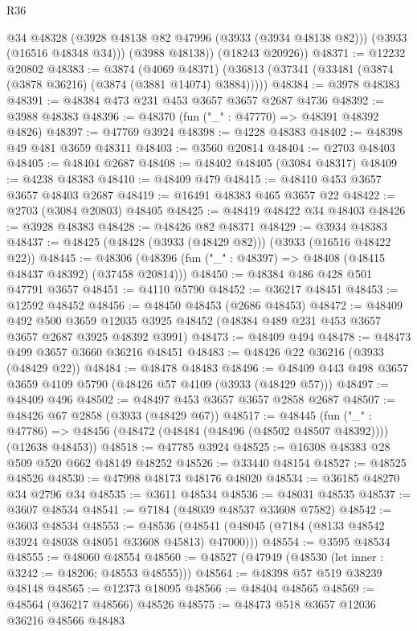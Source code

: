 \begin{lexlean}{R36}
\begin{coremodule}
          @34
          @48328
          (@3928 @48138 @82 @47996 (@3933 (@3934 @48138 @82)))
          (@3933 (@16516 @48348 @34)))
        (@3988 @48138))
      (@18243 @20926))
@48371 := @12232 @20802
@48383 := @3874
    (@4069 @48371)
    (@36813 (@37341 (@33481 (@3874 (@3878 @36216) (@3874 (@3881 @14074) @3884)))))
@48384 := @3978 @48383
@48391 := @48384 @473 @231 @453 @3657 @3657 @2687 @4736
@48392 := @3988 @48383
@48396 := @48370 (fun ("_" : @47770) => @48391 @48392 @4826)
@48397 := @47769 @3924
@48398 := @4228 @48383
@48402 := @48398 @49 @481 @3659 @48311
@48403 := @3560 @20814
@48404 := @2703 @48403
@48405 := @48404 @2687
@48408 := @48402 @48405 (@3084 @48317)
@48409 := @4238 @48383
@48410 := @48409 @479
@48415 := @48410 @453 @3657 @3657 @48403 @2687
@48419 := @16491 @48383 @465 @3657 @22
@48422 := @2703 (@3084 @20803) @48405
@48425 := @48419 @48422 @34 @48403
@48426 := @3928 @48383
@48428 := @48426 @82 @48371
@48429 := @3934 @48383
@48437 := @48425 (@48428 (@3933 (@48429 @82))) (@3933 (@16516 @48422 @22))
@48445 := @48306 (@48396 (fun ("_" : @48397) => @48408 (@48415 @48437 @48392) (@37458 @20814)))
@48450 := @48384 @486 @428 @501 @47791 @3657
@48451 := @4110 @5790
@48452 := @36217 @48451
@48453 := @12592 @48452
@48456 := @48450 @48453 (@2686 @48453)
@48472 := @48409
    @492
    @500
    @3659
    @12035
    @3925
    @48452
    (@48384 @489 @231 @453 @3657 @3657 @2687 @3925 @48392 @3991)
@48473 := @48409 @494
@48478 := @48473 @499 @3657 @3660 @36216 @48451
@48483 := @48426 @22 @36216 (@3933 (@48429 @22))
@48484 := @48478 @48483
@48496 := @48409 @443 @498 @3657 @3659 @4109 @5790 (@48426 @57 @4109 (@3933 (@48429 @57)))
@48497 := @48409 @496
@48502 := @48497 @453 @3657 @3657 @2858 @2687
@48507 := @48426 @67 @2858 (@3933 (@48429 @67))
@48517 := @48445
    (fun ("_" : @47786) => @48456 (@48472 (@48484 (@48496 (@48502 @48507 @48392)))) (@12638 @48453))
@48518 := @47785 @3924
@48525 := @16308 @48383 @28 @509 @520 @662 @48149 @48252
@48526 := @33440 @48154
@48527 := @48525 @48526
@48530 := @47998 @48173 @48176 @48020
@48534 := @36185 @48270 @34 @2796 @34
@48535 := @3611 @48534
@48536 := @48031 @48535
@48537 := @3607 @48534
@48541 := @7184 (@48039 @48537 @33608 @7582)
@48542 := @3603 @48534
@48553 := @48536 (@48541 (@48045 (@7184 (@8133 @48542 @3924 @48038 @48051 @33608 @45813) @47000)))
@48554 := @3595 @48534
@48555 := @48060 @48554
@48560 := @48527 (@47949 (@48530 (let inner : @3242 := @48206; @48553 @48555)))
@48564 := @48398 @57 @519 @38239 @48148
@48565 := @12373 @18095
@48566 := @48404 @48565
@48569 := @48564 (@36217 @48566) @48526
@48575 := @48473 @518 @3657 @12036 @36216 @48566 @48483

\end{coremodule}
\end{lexlean}
